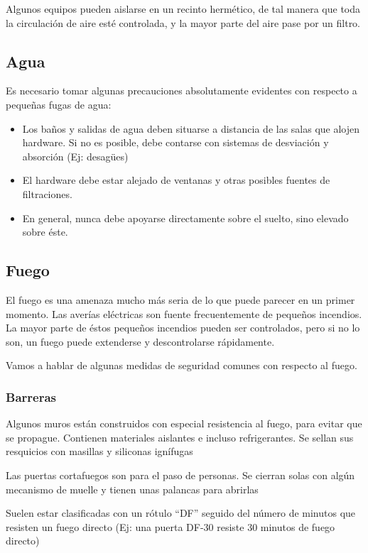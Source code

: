 \documentclass{article}
\begin{document}
Algunos equipos pueden aislarse en un recinto hermético, de tal manera que toda la circulación de aire esté controlada, y la mayor parte del aire pase por un filtro.

\subsection{Agua}
\label{sec:orgbb74a43}
Es necesario tomar algunas precauciones absolutamente evidentes con respecto a pequeñas fugas de agua:
\begin{itemize}
\item Los baños y salidas de agua deben situarse a distancia de las salas que alojen hardware. Si no es posible, debe contarse con sistemas de desviación y absorción (Ej: desagües)
\item El hardware debe estar alejado de ventanas y otras posibles fuentes de filtraciones.
\item En general, nunca debe apoyarse directamente sobre el suelto, sino elevado sobre éste.
\end{itemize}

\subsection{Fuego}
\label{sec:org14d8c15}
El fuego es una amenaza mucho más seria de lo que puede parecer en un primer momento. Las averías eléctricas son fuente frecuentemente de pequeños incendios. La mayor parte de éstos pequeños incendios pueden ser controlados, pero si no lo son, un fuego puede extenderse y descontrolarse rápidamente.

Vamos a hablar de algunas medidas de seguridad comunes con respecto al fuego.

\subsubsection{Barreras}
\label{sec:org15be208}
Algunos muros están construidos con especial resistencia al fuego, para evitar que se propague. Contienen materiales aislantes e incluso refrigerantes. Se sellan sus resquicios con masillas y siliconas ignífugas

Las puertas cortafuegos son para el paso de personas. Se cierran solas con algún mecanismo de muelle y tienen unas palancas para abrirlas

Suelen estar clasificadas con un rótulo “DF” seguido del número de minutos que resisten un fuego directo (Ej: una puerta DF-30 resiste 30 minutos de fuego directo)
\end{document}
